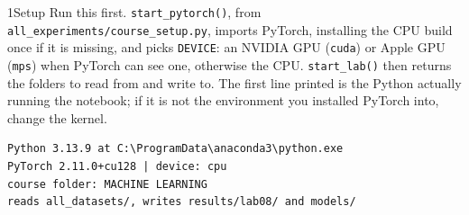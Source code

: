 \begin{labquestion}{1}{Setup}
Run this first. \texttt{start\_pytorch()}, from \texttt{all\_experiments/\allowbreak course\_setup.py}, imports PyTorch, installing the CPU build once if it is missing, and picks \texttt{DEVICE}: an NVIDIA GPU (\texttt{cuda}) or Apple GPU (\texttt{mps}) when PyTorch can see one, otherwise the CPU. \texttt{start\_lab()} then returns the folders to read from and write to. The first line printed is the Python actually running the notebook; if it is not the environment you installed PyTorch into, change the kernel.
\end{labquestion}
\begin{labanswer}

\begin{refoutput}
\begin{lstlisting}[style=utpterminal]
Python 3.13.9 at C:\ProgramData\anaconda3\python.exe
PyTorch 2.11.0+cu128 | device: cpu
course folder: MACHINE LEARNING
reads all_datasets/, writes results/lab08/ and models/
\end{lstlisting}
\end{refoutput}
\end{labanswer}


